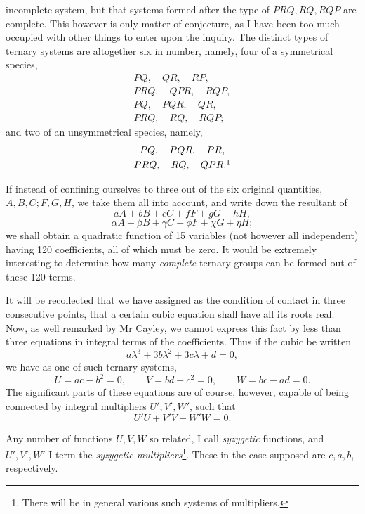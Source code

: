\documentclass[11pt]{article}
\newcommand{\sourcepage}[1]{\marginpar{\scriptsize p.~#1}}
\begin{document}
{{\sourcepage{131}
incomplete system, but that systems formed after the type of $PRQ,RQ,RQP$ are complete. This however is only matter of conjecture, as I have been too much occupied with other things to enter upon the inquiry. The distinct types of ternary systems are altogether six in number, namely, four of a symmetrical species,
\[
\begin{gathered}
PQ,\quad QR,\quad RP,\\
PRQ,\quad QPR,\quad RQP,\\
PQ,\quad PQR,\quad QR,\\
PRQ,\quad RQ,\quad RQP;
\end{gathered}
\]
and two of an unsymmetrical species, namely,
\[
\begin{gathered}
PQ,\quad PQR,\quad PR,\\
PRQ,\quad RQ,\quad QPR.\footnotemark
\end{gathered}
\]

If instead of confining ourselves to three out of the six original quantities, $A,B,C;F,G,H$, we take them all into account, and write down the resultant of
\[
aA+bB+cC+fF+gG+hH,
\]
\[
\alpha A+\beta B+\gamma C+\phi F+\chi G+\eta H;
\]
we shall obtain a quadratic function of 15 variables (not however all independent) having 120 coefficients, all of which must be zero. It would be extremely interesting to determine how many \emph{complete} ternary groups can be formed out of these 120 terms.

It will be recollected that we have assigned as the condition of contact in three consecutive points, that a certain cubic equation shall have all its roots real. Now, as well remarked by Mr Cayley, we cannot express this fact by less than three equations in integral terms of the coefficients. Thus if the cubic be written
\[
a\lambda^3+3b\lambda^2+3c\lambda+d=0,
\]
we have as one of such ternary systems,
\[
U=ac-b^2=0,\qquad V=bd-c^2=0,\qquad W=bc-ad=0.
\]
The significant parts of these equations are of course, however, capable of being connected by integral multipliers $U',V',W'$, such that
\[
U'U+V'V+W'W=0.
\]

\sourcepage{132}
Any number of functions $U,V,W$ so related, I call \emph{syzygetic} functions, and $U',V',W'$ I term the \emph{syzygetic multipliers}\footnote{There will be in general various such systems of multipliers.}. These in the case supposed are $c,a,b$, respectively.

}}
\end{document}
